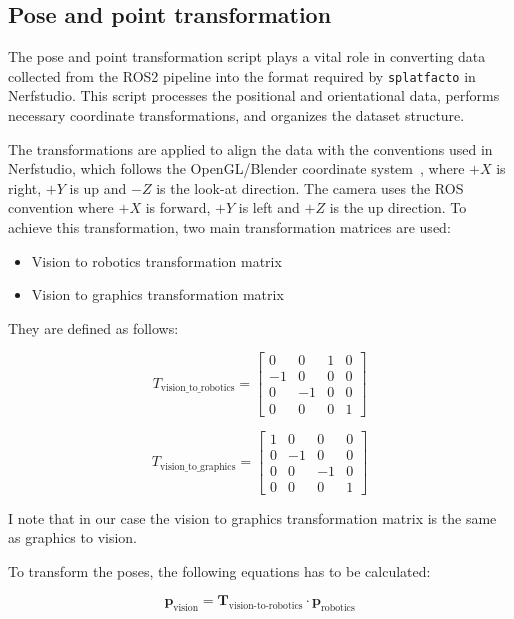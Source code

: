\subsection{Pose and point transformation}

The pose and point transformation script plays a vital role in converting data collected from the ROS2 pipeline into the format required by \verb|splatfacto| in Nerfstudio. This script processes the positional and orientational data, performs necessary coordinate transformations, and organizes the dataset structure.

The transformations are applied to align the data with the conventions used in Nerfstudio, which follows the OpenGL/Blender coordinate system~\cite{opengl_coordinate_system}, where \(+X\) is right, \(+Y\) is up and \(-Z\) is the look-at direction. The camera uses the ROS convention where \(+X\) is forward, \(+Y\) is left and \(+Z\) is the up direction. To achieve this transformation, two main transformation matrices are used:

\begin{itemize}
    \item Vision to robotics transformation matrix
    \item Vision to graphics transformation matrix
\end{itemize}

They are defined as follows:

\[
T_\text{vision\_to\_robotics} = \begin{bmatrix}
0 & 0 & 1 & 0 \\
-1 & 0 & 0 & 0 \\
0 & -1 & 0 & 0 \\
0 & 0 & 0 & 1
\end{bmatrix}
\]

\[
T_\text{vision\_to\_graphics} = \begin{bmatrix}
1 & 0 & 0 & 0 \\
0 & -1 & 0 & 0 \\
0 & 0 & -1 & 0 \\
0 & 0 & 0 & 1
\end{bmatrix}
\]

I note that in our case the vision to graphics transformation matrix is the same as graphics to vision.


To transform the poses, the following equations has to be calculated:

\begin{equation} \label{pose_rob_to_vis}
    \bm{p}_{\text{vision}} = \bm{T}_{\text{vision-to-robotics}} \cdot \bm{p}_{\text{robotics}}
\end{equation}

